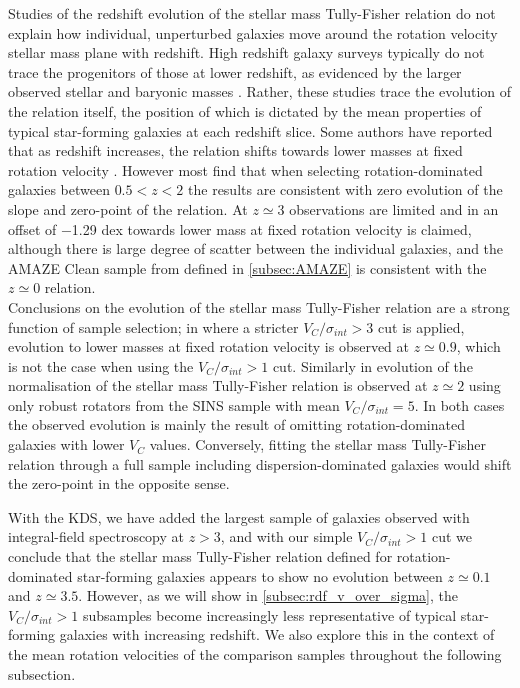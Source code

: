 \documentclass[fleqn,usenatbib]{mnras}
\begin{document}
Studies of the redshift evolution of the stellar mass Tully-Fisher relation do not explain how individual, unperturbed galaxies move around the rotation velocity stellar mass plane with redshift. 
High redshift galaxy surveys typically do not trace the progenitors of those at lower redshift, as evidenced by the larger observed stellar and baryonic masses \citep[e.g.][]{Cresci2009,Reyes2011,Wisnioski2015,Ubler2017}.
Rather, these studies trace the evolution of the relation itself, the position of which is dictated by the mean properties of typical star-forming galaxies at each redshift slice.
Some authors have reported that as redshift increases, the relation shifts towards lower masses at fixed rotation velocity \citep[e.g.][]{Puech2008,Cresci2009,Puech2010,Straatman2017,Ubler2017}.
However most find that when selecting rotation-dominated galaxies between $0.5 < z < 2$ \citep[e.g.][]{Flores2006,Miller2011,Kassin2012,Miller2012,Vergani2012,Miller2014,Contini2015a,DiTeodoro2016,Simons2016,Pelliccia2017,Molina2017,Harrison2017} the results are consistent with zero evolution of the slope and zero-point of the relation.
At $z\simeq3$ observations are limited and in \cite{Gnerucci2011} an offset of $-$1.29 dex towards lower mass at fixed rotation velocity is claimed, although there is large degree of scatter between the individual galaxies, and the AMAZE Clean sample from \cite{Gnerucci2011} defined in \cref{subsec:AMAZE} is consistent with the $z\simeq0$ relation. \\

Conclusions on the evolution of the stellar mass Tully-Fisher relation are a strong function of sample selection; in \cite{Tiley2016} where a stricter $V_{C}/\sigma_{int} > 3$ cut is applied, evolution to lower masses at fixed rotation velocity is observed at $z\simeq0.9$, which is not the case when using the $V_{C}/\sigma_{int} > 1$ cut.
Similarly in \cite{Cresci2009} evolution of the normalisation of the stellar mass Tully-Fisher relation is observed at $z\simeq2$ using only robust rotators from the SINS sample with mean $V_{C}/\sigma_{int} = 5$.
In both cases the observed evolution is mainly the result of omitting rotation-dominated galaxies with lower $V_{C}$ values.
Conversely, fitting the stellar mass Tully-Fisher relation through a full sample including dispersion-dominated galaxies would shift the zero-point in the opposite sense.

With the KDS, we have added the largest sample of galaxies observed with integral-field spectroscopy at $z>3$, and with our simple $V_{C}/\sigma_{int} > 1$ cut we conclude that the stellar mass Tully-Fisher relation defined for rotation-dominated star-forming galaxies appears to show no evolution between $z\simeq0.1$ and $z\simeq3.5$.
However, as we will show in \cref{subsec:rdf_v_over_sigma}, the $V_{C}/\sigma_{int} > 1$ subsamples become increasingly less representative of typical star-forming galaxies with increasing redshift.
We also explore this in the context of the mean rotation velocities of the comparison samples throughout the following subsection. 
\end{document}
